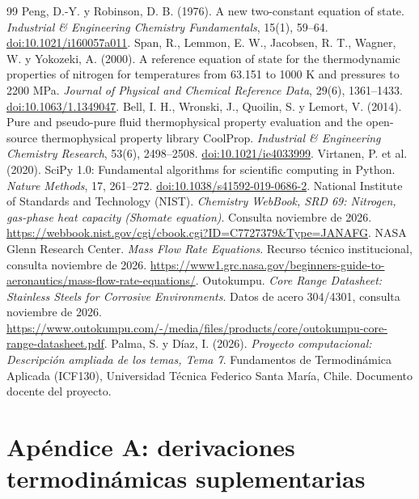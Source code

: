 \documentclass[11pt,letterpaper]{article}
\begin{document}
\begin{thebibliography}{99}
 Peng, D.-Y. y Robinson, D. B. (1976). A new two-constant equation of state. \textit{Industrial \& Engineering Chemistry Fundamentals}, 15(1), 59--64. \href{https://doi.org/10.1021/i160057a011}{doi:10.1021/i160057a011}.
 Span, R., Lemmon, E. W., Jacobsen, R. T., Wagner, W. y Yokozeki, A. (2000). A reference equation of state for the thermodynamic properties of nitrogen for temperatures from 63.151 to 1000 K and pressures to 2200 MPa. \textit{Journal of Physical and Chemical Reference Data}, 29(6), 1361--1433. \href{https://doi.org/10.1063/1.1349047}{doi:10.1063/1.1349047}.
 Bell, I. H., Wronski, J., Quoilin, S. y Lemort, V. (2014). Pure and pseudo-pure fluid thermophysical property evaluation and the open-source thermophysical property library CoolProp. \textit{Industrial \& Engineering Chemistry Research}, 53(6), 2498--2508. \href{https://doi.org/10.1021/ie4033999}{doi:10.1021/ie4033999}.
 Virtanen, P. et al. (2020). SciPy 1.0: Fundamental algorithms for scientific computing in Python. \textit{Nature Methods}, 17, 261--272. \href{https://doi.org/10.1038/s41592-019-0686-2}{doi:10.1038/s41592-019-0686-2}.
 National Institute of Standards and Technology (NIST). \textit{Chemistry WebBook, SRD 69: Nitrogen, gas-phase heat capacity (Shomate equation)}. Consulta noviembre de 2026. \url{https://webbook.nist.gov/cgi/cbook.cgi?ID=C7727379&Type=JANAFG}.
 NASA Glenn Research Center. \textit{Mass Flow Rate Equations}. Recurso técnico institucional, consulta noviembre de 2026. \url{https://www1.grc.nasa.gov/beginners-guide-to-aeronautics/mass-flow-rate-equations/}.
 Outokumpu. \textit{Core Range Datasheet: Stainless Steels for Corrosive Environments}. Datos de acero 304/4301, consulta noviembre de 2026. \url{https://www.outokumpu.com/-/media/files/products/core/outokumpu-core-range-datasheet.pdf}.
 Palma, S. y Díaz, I. (2026). \textit{Proyecto computacional: Descripción ampliada de los temas, Tema 7}. Fundamentos de Termodinámica Aplicada (ICF130), Universidad Técnica Federico Santa María, Chile. Documento docente del proyecto.
\end{thebibliography}

\clearpage
\appendix
\section{Apéndice A: derivaciones termodinámicas suplementarias}
\end{document}
